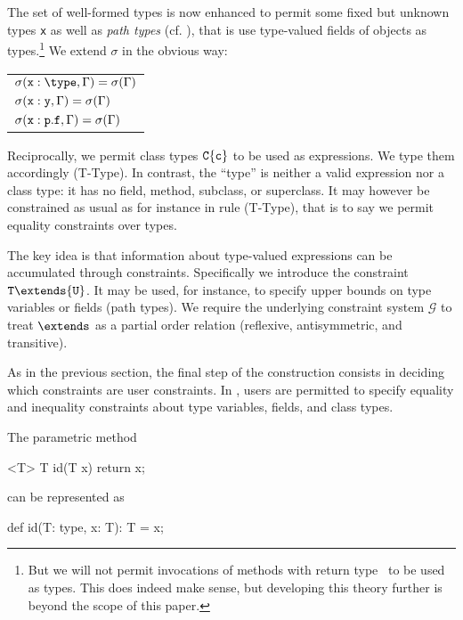 The set of well-formed types is now enhanced to permit some fixed but unknown
types {\tt x} as well as \emph{path types} (cf. \cite{scala}), that is use type-valued fields of objects as types.\footnote{But we will not permit invocations of methods with return type \type\ to be 
used as types. This does indeed make sense, but developing
this theory further is beyond the scope of this paper.} We extend $\sigma$ in the obvious way:
%
\begin{center}
\begin{tabular}{l}
$	\sigma({\tt x}:\type, \Gamma)=\sigma(\Gamma)$\\
$\sigma({\tt x}:{\tt y}, \Gamma)=\sigma(\Gamma)$\\
$\sigma({\tt x}:{\tt p}.{\tt f}, \Gamma)=\sigma(\Gamma)$
\end{tabular}
\end{center}
%
Reciprocally, we permit class types ${\tt C}\{{\tt c}\}$ to be used as expressions. We type them accordingly ({\sc T-Type}). In contrast, the ``type'' \type{} is neither a valid expression nor a class type: it has no field, method, subclass, or superclass. It may however be constrained as usual as for instance in rule ({\sc T-Type}), that is to say we permit equality constraints over types.

The key idea is that information about type-valued expressions can
be accumulated through constraints. Specifically we introduce 
the constraint ${\tt T}\extends{\tt U}$. It may be used, for
instance, to specify upper bounds on type variables or fields (path
types). We require the underlying constraint system $\mathcal{G}$ to treat $\extends$ as a partial order relation (reflexive, antisymmetric, and transitive).

As in the previous section, the final step of the construction consists in deciding which constraints are user constraints. In \FXG{}, users are permitted to specify equality and inequality constraints about type variables, fields, and class types.


\begin{example}
The \FGJ{} parametric method

\begin{xten} 
<T> T id(T x) { return x; }
\end{xten}
\noindent can be represented as
\begin{xten} 
def id(T: type, x: T): T = x;
\end{xten}
\end{example}

